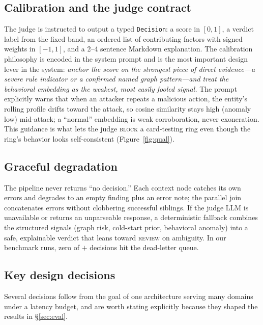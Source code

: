 \documentclass[sigconf,nonacm,screen]{acmart}
\begin{document}
\subsection{Calibration and the judge contract}

The judge is instructed to output a typed \texttt{Decision}: a score in $[0,1]$,
a verdict label from the fixed band, an ordered list of contributing factors with
signed weights in $[-1,1]$, and a 2--4 sentence Markdown explanation. The
calibration philosophy is encoded in the system prompt and is the most important
design lever in the system: \emph{anchor the score on the strongest piece of
direct evidence---a severe rule indicator or a confirmed named graph
pattern---and treat the behavioral embedding as the weakest, most easily fooled
signal.} The prompt explicitly warns that when an attacker repeats a malicious
action, the entity's rolling profile drifts toward the attack, so cosine
similarity stays high (anomaly low) mid-attack; a ``normal'' embedding is weak
corroboration, never exoneration. This guidance is what lets the judge
\textsc{block} a card-testing ring even though the ring's behavior looks
self-consistent (Figure~\ref{fig:qual}).

\subsection{Graceful degradation}

The pipeline never returns ``no decision.'' Each context node catches its own
errors and degrades to an empty finding plus an error note; the parallel join
concatenates errors without clobbering successful siblings. If the judge LLM is
unavailable or returns an unparseable response, a deterministic fallback combines
the structured signals (graph risk, cold-start prior, behavioral anomaly) into a
safe, explainable verdict that leans toward \textsc{review} on ambiguity. In our
benchmark runs, zero of \fraudndec{}$+$\secndec{} decisions hit the dead-letter
queue.

\subsection{Key design decisions}

Several decisions follow from the goal of one architecture serving many domains
under a latency budget, and are worth stating explicitly because they shaped the
results in \S\ref{sec:eval}.
\end{document}
